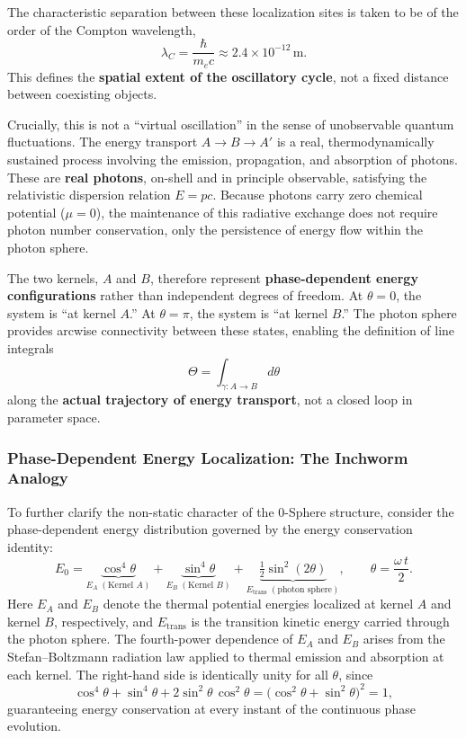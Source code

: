 \documentclass[12pt,letterpaper]{article}
\begin{document}
The characteristic separation between these localization sites is taken to be of the order of the Compton wavelength,
\begin{equation}
\lambda_C = \frac{\hbar}{m_e c} \approx 2.4 \times 10^{-12} \, \mathrm{m}.
\end{equation}
This defines the \textbf{spatial extent of the oscillatory cycle}, not a fixed distance between coexisting objects.

Crucially, this is not a ``virtual oscillation'' in the sense of unobservable quantum fluctuations. The energy transport $A \to B \to A'$ is a real, thermodynamically sustained process involving the emission, propagation, and absorption of photons. These are \textbf{real photons}, on-shell and in principle observable, satisfying the relativistic dispersion relation $E = pc$. Because photons carry zero chemical potential ($\mu = 0$), the maintenance of this radiative exchange does not require photon number conservation, only the persistence of energy flow within the photon sphere.

The two kernels, $A$ and $B$, therefore represent \textbf{phase-dependent energy configurations} rather than independent degrees of freedom. At $\theta = 0$, the system is ``at kernel $A$.'' At $\theta = \pi$, the system is ``at kernel $B$.'' The photon sphere provides arcwise connectivity between these states, enabling the definition of line integrals
\begin{equation}
\Theta = \int_{\gamma: A \to B} d\theta
\end{equation}
along the \textbf{actual trajectory of energy transport}, not a closed loop in parameter space.

\subsubsection{Phase-Dependent Energy Localization: The Inchworm Analogy}
\label{subsubsec:inchworm}

To further clarify the non-static character of the 0-Sphere structure, consider the phase-dependent energy distribution governed by the energy conservation identity:
\begin{equation}
  E_0 = \underbrace{\cos^4\!\theta}_{E_A\;(\text{Kernel }A)} + \underbrace{\sin^4\!\theta}_{E_B\;(\text{Kernel }B)} + \underbrace{\tfrac{1}{2}\sin^2\!(2\theta)}_{E_{\mathrm{trans}}\;(\text{photon sphere})}, \qquad \theta = \frac{\omega\,t}{2}.
\end{equation}
Here $E_A$ and $E_B$ denote the thermal potential energies localized at kernel $A$ and kernel $B$, respectively, and $E_{\mathrm{trans}}$ is the transition kinetic energy carried through the photon sphere. The fourth-power dependence of $E_A$ and $E_B$ arises from the Stefan--Boltzmann radiation law applied to thermal emission and absorption at each kernel. The right-hand side is identically unity for all $\theta$, since
\[
  \cos^4\!\theta + \sin^4\!\theta + 2\sin^2\!\theta\,\cos^2\!\theta = \bigl(\cos^2\!\theta + \sin^2\!\theta\bigr)^2 = 1,
\]
guaranteeing energy conservation at every instant of the continuous phase evolution.
\end{document}
